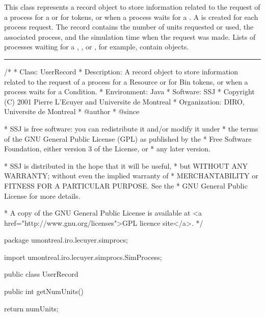 
This class represents a record object to store 
information related to the request of a process for a
 or for  tokens, 
or when a process waits for a .
A  is created for each process request.
The record contains the number of units requested 
or used, the associated process, and the
simulation time when the request was made.
Lists of processes waiting for a ,
, or , for example, contain
 objects.


\bigskip\hrule

\begin{code}
\begin{hide}
/*
 * Class:        UserRecord
 * Description:  A record object to store information related to the request
                 of a process for a Resource or for Bin tokens, or when a 
                 process waits for a Condition.
 * Environment:  Java
 * Software:     SSJ 
 * Copyright (C) 2001  Pierre L'Ecuyer and Universite de Montreal
 * Organization: DIRO, Universite de Montreal
 * @author       
 * @since

 * SSJ is free software: you can redistribute it and/or modify it under
 * the terms of the GNU General Public License (GPL) as published by the
 * Free Software Foundation, either version 3 of the License, or
 * any later version.

 * SSJ is distributed in the hope that it will be useful,
 * but WITHOUT ANY WARRANTY; without even the implied warranty of
 * MERCHANTABILITY or FITNESS FOR A PARTICULAR PURPOSE.  See the
 * GNU General Public License for more details.

 * A copy of the GNU General Public License is available at
   <a href="http://www.gnu.org/licenses">GPL licence site</a>.
 */
\end{hide}
package umontreal.iro.lecuyer.simprocs;\begin{hide}

import umontreal.iro.lecuyer.simprocs.SimProcess;
\end{hide}

public class UserRecord \begin{hide} {
   // Nb. of units taken for this record.
   protected int numUnits;

   // Process associated to the record
   protected SimProcess process;

   // Priority of this process.
   // protected double priority;

   // Time of the record creation
   protected double requestTime;

   // Constructor.
   // We do not want the user to construct such objects.
   protected UserRecord (int n, SimProcess p, double requestTime) {
      numUnits = n;
      process = p;
      this.requestTime = requestTime;
   }\end{hide}

   public int getNumUnits()\begin{hide} {
      return numUnits;
   }\end{hide}
\end{code}
